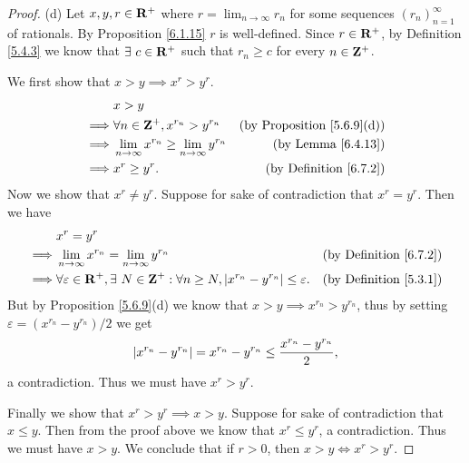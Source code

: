 \begin{proof}{(d)}
    Let \(x, y, r \in \mathbf{R}^+\) where \(r = \lim_{n \to \infty} r_n\) for some sequences \((r_n)_{n = 1}^\infty\) of rationals.
    By Proposition \ref{6.1.15} \(r\) is well-defined.
    Since \(r \in \mathbf{R}^+\), by Definition \ref{5.4.3} we know that \(\exists\ c \in \mathbf{R}^+\) such that \(r_n \geq c\) for every \(n \in \mathbf{Z}^+\).

    We first show that \(x > y \implies x^r > y^r\).
    \begin{align*}
                 & x > y                                                                                                 \\
        \implies & \forall n \in \mathbf{Z}^+, x^{r_n} > y^{r_n}                        & \text{(by Proposition \ref{5.6.9}(d))} \\
        \implies & \lim_{n \to \infty} x^{r_n} \geq \lim_{n \to \infty} y^{r_n} & \text{(by Lemma \ref{6.4.13})}         \\
        \implies & x^r \geq y^r.                                                & \text{(by Definition \ref{6.7.2})}
    \end{align*}
    Now we show that \(x^r \neq y^r\).
    Suppose for sake of contradiction that \(x^r = y^r\).
    Then we have
    \begin{align*}
                 & x^r = y^r                                                                                                                                            \\
        \implies & \lim_{n \to \infty} x^{r_n} = \lim_{n \to \infty} y^{r_n}                                                       & \text{(by Definition \ref{6.7.2})} \\
        \implies & \forall \varepsilon \in \mathbf{R}^+, \exists\ N \in \mathbf{Z}^+ : \forall n \geq N, \left\lvert x^{r_n} - y^{r_n}\right\rvert \leq \varepsilon. & \text{(by Definition \ref{5.3.1})}
    \end{align*}
    But by Proposition \ref{5.6.9}(d) we know that \(x > y \implies x^{r_n} > y^{r_n}\), thus by setting \(\varepsilon = (x^{r_n} - y^{r_n}) / 2\) we get
    \[
        \left\lvert x^{r_n} - y^{r_n}\right\rvert = x^{r_n} - y^{r_n} \leq \frac{x^{r_n} - y^{r_n}}{2},
    \]
    a contradiction.
    Thus we must have \(x^r > y^r\).

    Finally we show that \(x^r > y^r \implies x > y\).
    Suppose for sake of contradiction that \(x \leq y\).
    Then from the proof above we know that \(x^r \leq y^r\), a contradiction.
    Thus we must have \(x > y\).
    We conclude that if \(r > 0\), then \(x > y \iff x^r > y^r\).
\end{proof}

